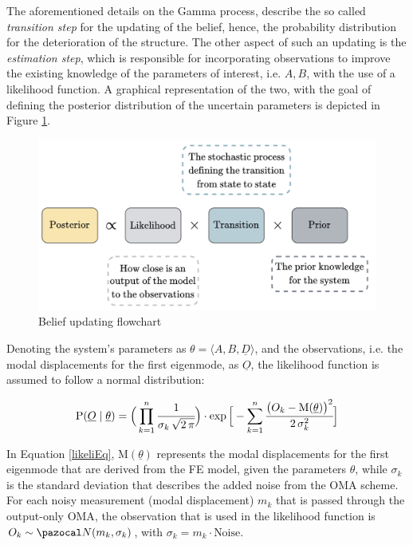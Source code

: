 The aforementioned details on the Gamma process, describe the so called \textit{transition step} for the updating of the belief, hence, the probability distribution for the deterioration of the structure. The other aspect of such an updating is the \textit{estimation step}, which is responsible for incorporating observations to improve the existing knowledge of the parameters of interest, i.e. $A, B$, with the use of a likelihood function. A graphical representation of the two, with the goal of defining the posterior distribution of the uncertain parameters is depicted in Figure \ref{beliefUpdFlow}.

\begin{figure}[H]
    \centering
	\includegraphics[width=0.7\linewidth]{Figures/beliefUpdate.png}
	\caption{Belief updating flowchart}
	\label{beliefUpdFlow}
\end{figure}

Denoting the system's parameters as $\theta = \langle A, B, \underline{D} \rangle$, and the observations, i.e. the modal displacements for the first eigenmode, as $\underline{O}$, the likelihood function is assumed to follow a normal distribution:


\begin{equation}
    \text{P}(\underline{O}\mid \underline{\theta}) = \Big (\prod _{k=1}^n \cfrac{1}{\sigma _k \, \sqrt{2\, \pi}}\Big) \cdot \exp{\Big[ -\sum _{k=1}^n \cfrac{\big(O_k - \mathrm{M}(\underline{\theta})\big)^2}{2\, \sigma_k^2} \Big]} \label{likeliEq}
\end{equation}

In Equation \ref{likeliEq}, $\mathrm{M}(\underline{\theta})$ represents the modal displacements for the first eigenmode that are derived from the \gls{FE} model, given the parameters $\theta$, while $\sigma_k$ is the standard deviation that describes the added noise from the \gls{OMA} scheme. For each noisy measurement (modal displacement) $m_k$ that is passed through the output-only \gls{OMA}, the observation that is used in the likelihood function is $O_k \sim \ccal{N}(m_k, \sigma_k)$, with $\sigma_k = m_k \cdot \text{Noise}$.\\

